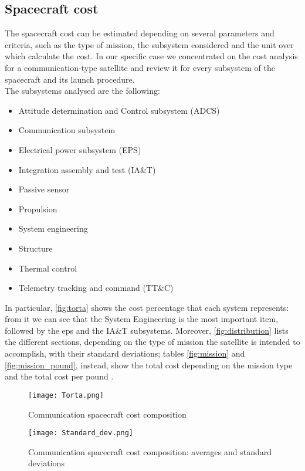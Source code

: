 \subsection{Spacecraft cost}
	The spacecraft cost can be estimated depending on several parameters and criteria, such as the type of mission, the subsystem considered and the unit over which calculate the cost. In our specific case we concentrated on the cost analysis for a communication-type satellite and review it for every subsystem of the spacecraft and its launch procedure.\\

	The subsystems analysed  are the following:
	\begin{itemize}
		\item Attitude determination and Control subsystem (ADCS)
		\item Communication subsystem
		\item Electrical power subsystem (EPS)
		\item Integration assembly and test (IA\&T)
		\item Passive sensor
		\item Propulsion
		\item System engineering
		\item Structure
		\item Thermal control
		\item Telemetry tracking and command (TT\&C)
	\end{itemize}
	In particular, \autoref{fig:torta} shows the cost percentage that each system represents: from it we can see that the System Engineering is the most important item, followed by the \gls{eps} and the IA\&T subsystems. Moreover, \autoref{fig:distribution} lists the different sections, depending on the type of mission the satellite is intended to 					accomplish, with their standard deviations; tables \ref{fig:mission} and \ref{fig:mission_pound}, instead, show the total cost depending on the mission type and the total cost per pound \cite{Fox2008}.

	\begin{figure}
		\centering
		\texttt{[image: Torta.png]}
		\caption{Communication spacecraft cost composition}
		\label{fig:torta}
	\end{figure}

	\begin{figure}
		\centering
		\texttt{[image: Standard\_dev.png]}
		\caption{Communication spacecraft cost composition: averages and standard deviations}
		\label{fig:distribution}
	\end{figure}

